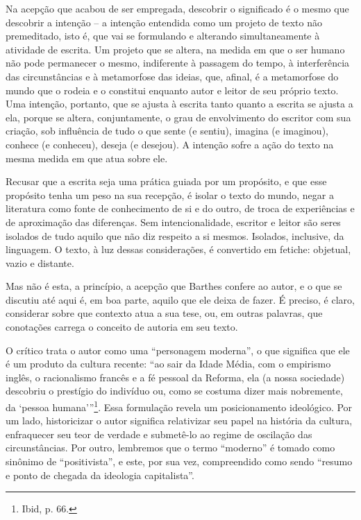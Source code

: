 Na acepção que acabou de ser empregada, descobrir o significado é o
mesmo que descobrir a intenção -- a intenção entendida como um projeto
de texto não premeditado, isto é, que vai se formulando e alterando
simultaneamente à atividade de escrita. Um projeto que se altera, na
medida em que o ser humano não pode permanecer o mesmo, indiferente à
passagem do tempo, à interferência das circunstâncias e à metamorfose
das ideias, que, afinal, é a metamorfose do mundo que o rodeia e o
constitui enquanto autor e leitor de seu próprio texto. Uma intenção,
portanto, que se ajusta à escrita tanto quanto a escrita se ajusta a
ela, porque se altera, conjuntamente, o grau de envolvimento do escritor
com sua criação, sob influência de tudo o que sente (e sentiu), imagina
(e imaginou), conhece (e conheceu), deseja (e desejou). A intenção sofre
a ação do texto na mesma medida em que atua sobre ele.

Recusar que a escrita seja uma prática guiada por um propósito, e que
esse propósito tenha um peso na sua recepção, é isolar o texto do mundo,
negar a literatura como fonte de conhecimento de si e do outro, de troca
de experiências e de aproximação das diferenças. Sem intencionalidade,
escritor e leitor são seres isolados de tudo aquilo que não diz respeito
a si mesmos. Isolados, inclusive, da linguagem. O texto, à luz dessas
considerações, é convertido em fetiche: objetual, vazio e distante.

Mas não é esta, a princípio, a acepção que Barthes confere ao autor, e o
que se discutiu até aqui é, em boa parte, aquilo que ele deixa de fazer.
É preciso, é claro, considerar sobre que contexto atua a sua tese, ou, em
outras palavras, que conotações carrega o conceito de autoria em seu
texto.

O crítico trata o autor como uma ``personagem moderna'', o que significa
que ele é um produto da cultura recente: ``ao sair da Idade Média, com o
empirismo inglês, o racionalismo francês e a fé pessoal da Reforma, ela
(a nossa sociedade) descobriu o prestígio do indivíduo ou, como se
costuma dizer mais nobremente, da `pessoa humana'''\footnote{Ibid, p.
  66.}. Essa formulação revela um posicionamento ideológico. Por um
lado, historicizar o autor significa relativizar seu papel na história
da cultura, enfraquecer seu teor de verdade e submetê-lo ao regime de
oscilação das circunstâncias. Por outro, lembremos que o termo
``moderno'' é tomado como sinônimo de ``positivista'', e este, por sua
vez, compreendido como sendo ``resumo e ponto de chegada da ideologia
capitalista''.

